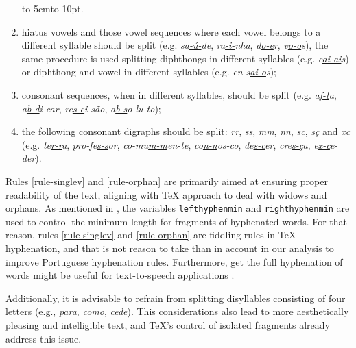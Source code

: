 \documentclass{article}
\begin{document}
\begin{enumerate}
    \hspace{10em} \hbox to 5cm{\leaders\hbox to 10pt{\hss . \hss}\hfil} 

    \item\label{rule-hiatus} hiatus vowels and those vowel sequences where each vowel
	belongs to a different syllable should be split (e.g.
	\emph{sa\underline{-ú-}de}, \emph{ra\underline{-i-}nha}, \emph{d\underline{o-e}r},
	\emph{v\underline{o-o}s}), the same procedure is used splitting diphthongs
	in different syllables (e.g. \emph{c\underline{ai-ai}s}) or diphthong and
	vowel in different syllables (e.g. \emph{en-s\underline{ai-o}s});
    \item\label{rule-consonants} consonant sequences, when in different syllables, should
	be split (e.g. \emph{a\underline{f-t}a}, \emph{a\underline{b-d}i-car},
	\emph{re\underline{s-c}i-são}, \emph{a\underline{b-s}o-lu-to});
    \item\label{rule-digraphs} the following consonant digraphs should be split:
	\emph{rr}, \emph{ss}, \emph{mm}, \emph{nn}, \emph{sc}, \emph{sç} and
	\emph{xc} (e.g. \emph{te\underline{r-r}a}, \emph{pro-fe\underline{s-s}or},
	\emph{co-mu\underline{\emph{m-m}}en-te}, \emph{co\underline{n-n}os-co},
	\emph{de\underline{s-c}er}, \emph{cre\underline{s-ç}a}, \emph{e\underline{x-c}e-der}).
\end{enumerate}

Rules \ref{rule-singlev} and \ref{rule-orphan} are primarily aimed at ensuring
proper readability of the text, aligning with \TeX{} approach to deal with
widows and orphans. As mentioned in , the variables
\verb|lefthyphenmin| and \verb|righthyphenmin| are used to control the minimum
length for fragments of hyphenated words. For that reason, rules
\ref{rule-singlev} and \ref{rule-orphan} are fiddling rules in \TeX{}
hyphenation, and that is not reason to take than in account in our analysis to
improve Portuguese hyphenation rules. Furthermore, get the full hyphenation of
words might be useful for text-to-speech applications \parencite{libossek2000,trogkanis2010}.

Additionally, it is advisable to refrain from
splitting disyllables consisting of four letters (e.g., \emph{para},
\emph{como}, \emph{cede}). This considerations also lead to more aesthetically
pleasing and intelligible text, and \TeX{}'s control of isolated fragments already
address this issue.

\end{document}

